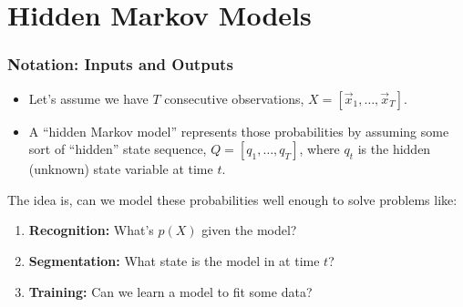 \documentclass{beamer}
\begin{document}
\section[HMM]{Hidden Markov Models}
\setcounter{subsection}{1}

\begin{frame}
  \frametitle{Notation: Inputs and Outputs}

  \begin{itemize}
  \item Let's assume we have $T$ consecutive 
    observations, $X=[\vec{x}_1,\ldots,\vec{x}_T]$.
  \item A ``hidden Markov model'' represents those probabilities by
    assuming some sort of ``hidden'' state sequence,
    $Q=[q_1,\ldots,q_T]$, where $q_t$ is the hidden (unknown) state
    variable at time $t$.
  \end{itemize}
  The idea is, can we model these probabilities well enough to solve
  problems like:
  \begin{enumerate}
  \item {\bf Recognition:} What's $p(X)$ given the  model?
  \item {\bf Segmentation:} What state is the model in at time $t$?
  \item {\bf Training:} Can we learn a model to fit some data?
  \end{enumerate}
\end{frame}
\end{document}

